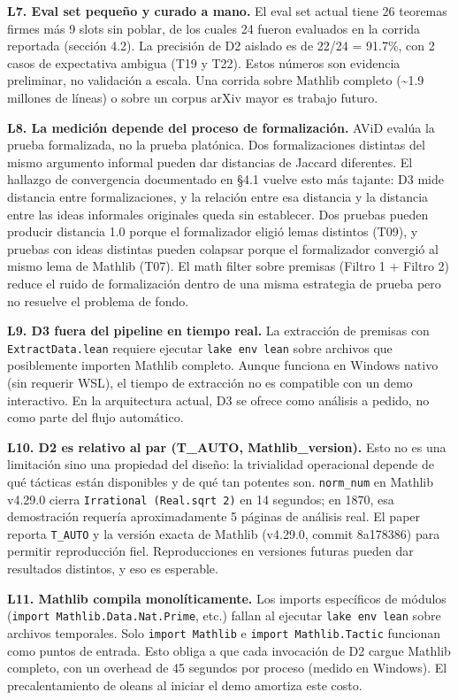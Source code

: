 \documentclass[12pt,a4paper]{article}
\theoremstyle{remark}
\begin{document}
\textbf{L7. Eval set pequeño y curado a mano.} El eval set actual tiene 26 teoremas firmes más 9 slots sin poblar, de los cuales 24 fueron evaluados en la corrida reportada (sección 4.2). La precisión de D2 aislado es de 22/24 = 91.7\%, con 2 casos de expectativa ambigua (T19 y T22). Estos números son evidencia preliminar, no validación a escala. Una corrida sobre Mathlib completo (\textasciitilde{}1.9 millones de líneas) o sobre un corpus arXiv mayor es trabajo futuro.


\textbf{L8. La medición depende del proceso de formalización.} AViD evalúa la prueba formalizada, no la prueba platónica. Dos formalizaciones distintas del mismo argumento informal pueden dar distancias de Jaccard diferentes. El hallazgo de convergencia documentado en §4.1 vuelve esto más tajante: D3 mide distancia entre formalizaciones, y la relación entre esa distancia y la distancia entre las ideas informales originales queda sin establecer. Dos pruebas pueden producir distancia 1.0 porque el formalizador eligió lemas distintos (T09), y pruebas con ideas distintas pueden colapsar porque el formalizador convergió al mismo lema de Mathlib (T07). El math filter sobre premisas (Filtro 1 + Filtro 2) reduce el ruido de formalización dentro de una misma estrategia de prueba pero no resuelve el problema de fondo.


\textbf{L9. D3 fuera del pipeline en tiempo real.} La extracción de premisas con \texttt{ExtractData.lean} requiere ejecutar \texttt{lake env lean} sobre archivos que posiblemente importen Mathlib completo. Aunque funciona en Windows nativo (sin requerir WSL), el tiempo de extracción no es compatible con un demo interactivo. En la arquitectura actual, D3 se ofrece como análisis a pedido, no como parte del flujo automático.


\textbf{L10. D2 es relativo al par (T\_AUTO, Mathlib\_version).} Esto no es una limitación sino una propiedad del diseño: la trivialidad operacional depende de qué tácticas están disponibles y de qué tan potentes son. \texttt{norm\_num} en Mathlib v4.29.0 cierra \texttt{Irrational (Real.sqrt 2)} en 14 segundos; en 1870, esa demostración requería aproximadamente 5 páginas de análisis real. El paper reporta \texttt{T\_AUTO} y la versión exacta de Mathlib (v4.29.0, commit 8a178386) para permitir reproducción fiel. Reproducciones en versiones futuras pueden dar resultados distintos, y eso es esperable.


\textbf{L11. Mathlib compila monolíticamente.} Los imports específicos de módulos (\texttt{import Mathlib.Data.Nat.Prime}, etc.) fallan al ejecutar \texttt{lake env lean} sobre archivos temporales. Solo \texttt{import Mathlib} e \texttt{import Mathlib.Tactic} funcionan como puntos de entrada. Esto obliga a que cada invocación de D2 cargue Mathlib completo, con un overhead de 45 segundos por proceso (medido en Windows). El precalentamiento de oleans al iniciar el demo amortiza este costo.
\end{document}
